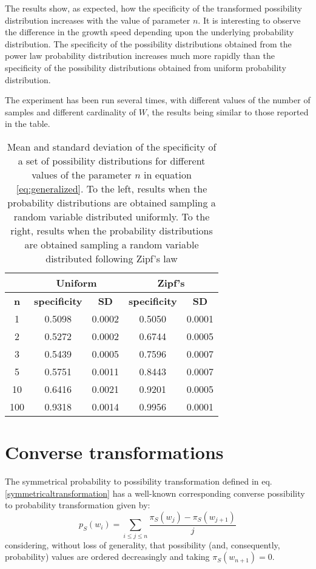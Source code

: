 \documentclass[a4paper]{article}
\begin{document}
The results show, as expected, how the specificity of the transformed possibility distribution increases with the value of parameter $n$. It is interesting to observe the difference in the growth speed depending upon the underlying probability distribution. The specificity of the possibility distributions obtained from the power law probability distribution increases much more rapidly than the specificity of the possibility distributions obtained from uniform probability distribution.

The experiment has been run several times, with different values of the number of samples and different cardinality of $W$, the results being similar to those reported in the table.
\begin{table}[]
\centering
\caption{Mean and standard deviation of the specificity of a set of possibility distributions for different values of the parameter $n$ in equation \ref{eq:generalized}. To the left, results when the probability  distributions are obtained sampling a random variable distributed uniformly. To the right, results when the probability distributions are obtained sampling a random variable distributed following Zipf's law  }
\label{exp_results}
\begin{tabular}{@{}ccccc@{}}
\toprule
           & \multicolumn{2}{c}{\textbf{Uniform}} & \multicolumn{2}{c}{\textbf{Zipf's}} \\ \midrule
\textbf{n} & \textbf{specificity}  & \textbf{SD}  & \textbf{specificity}  & \textbf{SD} \\
1          & 0.5098                & 0.0002       & 0.5050                & 0.0001      \\
2          & 0.5272                & 0.0002       & 0.6744                & 0.0005      \\
3          & 0.5439                & 0.0005       & 0.7596                & 0.0007      \\
5          & 0.5751                & 0.0011       & 0.8443                & 0.0007      \\
10         & 0.6416                & 0.0021       & 0.9201                & 0.0005      \\
100        & 0.9318                & 0.0014       & 0.9956                & 0.0001      \\ \bottomrule
\end{tabular}
\end{table}
\section{Converse transformations}
The symmetrical probability to possibility transformation defined in eq. \ref{symmetricaltransformation} has a well-known \cite{Dubois:1983} corresponding converse possibility to probability transformation given by:
\begin{equation}
p_S(w_i)=\sum_{i \leq j \leq n}\frac{\pi_S(w_j)-\pi_S(w_{j+1})}{j}
\end{equation}
considering, without loss of generality, that possibility (and, consequently, probability) values are ordered decreasingly and taking  $\pi_S(w_{n+1})=0$.
\end{document}
